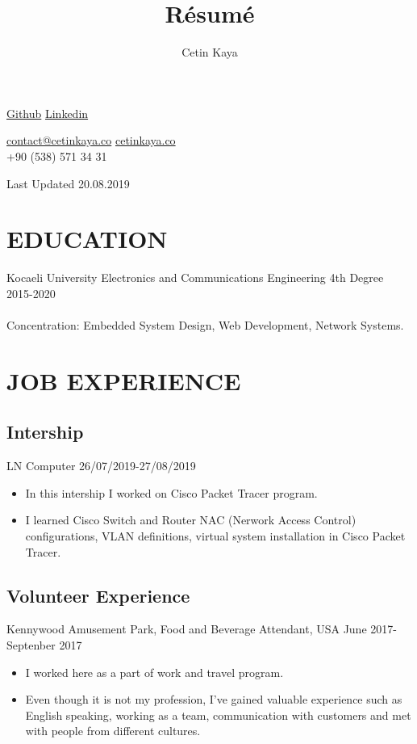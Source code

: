 \documentclass[10pt]{article}
\makeatletter
\renewcommand{\maketitle}{
\begin{center}
{\huge
\thetitle{
}
\vspace{0.5em}

}
{
\huge \bfseries
\theauthor}
\vspace{0.5em}

\faGithub\hspace{0.5em}\textcolor{Mycolor1}{\href{https://github.com/Zrrck?tab=repositories}{Github}}\hspace{0.5em}
\faLinkedin\hspace{0.5em}\textcolor{Mycolor1}{\href{https://www.linkedin.com/in/cetin-kaya/}{Linkedin}}\\\vspace{0.5em}

\faEnvelope \hspace{0.2em}\href{mailto:contact@cetinkaya.co}{contact@cetinkaya.co}\hspace{0.2em}
\faWordpress \hspace{0.2em}\textcolor{Mycolor1}{\href{http://cetinkaya.co}{cetinkaya.co}}\hspace{0.2em}\\
\vspace{0.5em}
\faPhoneSquare+90 (538) 571 34 31\vspace{1.em}



Last Updated 20.08.2019

\end{center}
}
\makeatother
\begin{document}
\title{R\'esum\'e}
\author{Cetin Kaya}
\maketitle




\section{EDUCATION}
Kocaeli University Electronics and Communications Engineering 4th Degree \hspace{10.em} 2015-2020
\\ \\
Concentration: Embedded System Design, Web Development, Network Systems.

\section{JOB EXPERIENCE}
\subsection{Intership}
LN Computer\hspace{30.em} 26/07/2019-27/08/2019
\begin{itemize}
\itemsep0em
\item In this intership I worked on Cisco Packet Tracer program. 
\item I learned  Cisco Switch and Router NAC (Nerwork Access Control) configurations, VLAN definitions, virtual system installation in Cisco Packet Tracer.
\end{itemize}


\subsection{Volunteer Experience}
Kennywood Amusement Park, Food and Beverage Attendant, USA \hspace{6.em}June 2017-Septenber 2017

\begin{itemize}
\itemsep0em
\item I worked here as a part of work and travel program. 
\item Even though it is not my profession, I've gained valuable
experience such as English speaking, working as a team,
communication with customers and met with people from different
cultures.
\end{itemize}
\end{document}
